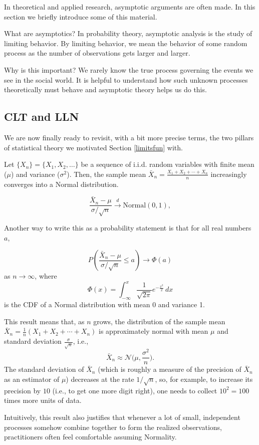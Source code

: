 \documentclass[
]{book}
\begin{document}
In theoretical and applied research, asymptotic arguments are often made. In this section we briefly introduce some of this material.

What are asymptotics? In probability theory, asymptotic analysis is the study of limiting behavior. By limiting behavior, we mean the behavior of some random process as the number of observations gets larger and larger.

Why is this important? We rarely know the true process governing the events we see in the social world. It is helpful to understand how such unknown processes theoretically must behave and asymptotic theory helps us do this.

\hypertarget{clt-and-lln}{%
\subsection{CLT and LLN}\label{clt-and-lln}}

We are now finally ready to revisit, with a bit more precise terms, the two pillars of statistical theory we motivated Section \ref{limitsfun} with.

\begin{theorem}
\protect\hypertarget{thm:clt}{}\label{thm:clt}Let \(\{X_n\} = \{X_1, X_2, \ldots\}\) be a sequence of i.i.d. random variables with finite mean (\(\mu\)) and variance (\(\sigma^2\)). Then, the sample mean \(\bar{X}_n = \frac{X_1 + X_2 + \cdots + X_n}{n}\) increasingly converges into a Normal distribution.

\[\frac{\bar{X}_n - \mu}{\sigma / \sqrt{n}} \xrightarrow{d} \text{Normal}(0, 1),\]

Another way to write this as a probability statement is that for all real numbers \(a\),

\[P\left(\frac{\bar{X}_n - \mu}{\sigma/\sqrt{n}} \le a\right) \rightarrow \Phi(a)\]
as \(n\to \infty\), where \[\Phi(x) = \int_{-\infty}^x \frac{1}{\sqrt{2\pi}}e^{-\frac{x^2}{2}} \, dx\] is the CDF of a Normal distribution with mean 0 and variance 1.

This result means that, as \(n\) grows, the distribution of the sample mean \(\bar X_n = \frac{1}{n} (X_1 + X_2 + \cdots + X_n)\) is approximately normal with mean \(\mu\) and standard deviation \(\frac{\sigma}{\sqrt n}\), i.e.,
\[\bar{X}_n \approx \mathcal{N}\bigg(\mu, \frac{\sigma^2}{n}\bigg).\] The standard deviation of \(\bar X_n\) (which is roughly a measure of the precision of \(\bar X_n\) as an estimator of \(\mu\)) decreases at the rate \(1/\sqrt{n}\), so, for example, to increase its precision by \(10\) (i.e., to get one more digit right), one needs to collect \(10^2=100\) times more units of data.

Intuitively, this result also justifies that whenever a lot of small, independent processes somehow combine together to form the realized observations, practitioners often feel comfortable assuming Normality.
\end{theorem}
\end{document}
